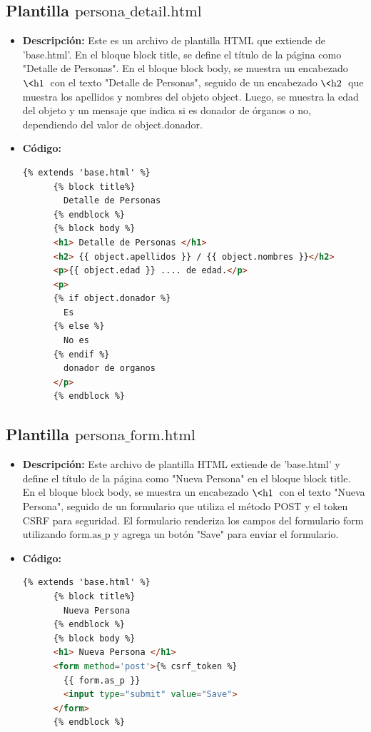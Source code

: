 \documentclass{article}
\begin{document}

  \subsection{Plantilla $\text{persona\_detail.html}$}
  \begin{itemize}
    \item \textbf{Descripción: }Este es un archivo de plantilla HTML que extiende de 'base.html'. 
    En el bloque block title, se define el título de la página como "Detalle de Personas". 
    En el bloque block body, se muestra un encabezado $\text{\<h1\>}$ con el texto "Detalle de Personas", 
    seguido de un encabezado $\text{\<h2\>}$ que muestra los apellidos y nombres del objeto object. Luego, se 
    muestra la edad del objeto y un mensaje que indica si es donador de órganos o no, dependiendo del valor de object.donador.
    \item \textbf{Código: }
    \begin{lstlisting}[language=html]
      {% extends 'base.html' %}
      {% block title%}
        Detalle de Personas
      {% endblock %}
      {% block body %}
      <h1> Detalle de Personas </h1>
      <h2> {{ object.apellidos }} / {{ object.nombres }}</h2>
      <p>{{ object.edad }} .... de edad.</p>
      <p>
      {% if object.donador %}
        Es
      {% else %}
        No es
      {% endif %}
        donador de organos
      </p>
      {% endblock %}
    \end{lstlisting}   
  \end{itemize}
  

  \subsection{Plantilla $\text{persona\_form.html}$}
  \begin{itemize}
    \item \textbf{Descripción: }Este archivo de plantilla HTML extiende de 'base.html' y define el título de la página como 
    "Nueva Persona" en el bloque block title. En el bloque block body, se muestra un encabezado $\text{\<h1\>}$
    con el texto "Nueva Persona", seguido de un formulario que utiliza el método POST y el token CSRF para seguridad. 
    El formulario renderiza los campos del formulario form utilizando {{ $\text{form.as\_p}$ }} y agrega un botón "Save" para 
    enviar el formulario.
    \item \textbf{Código: }
    \begin{lstlisting}[language=html]
      {% extends 'base.html' %}
      {% block title%}
        Nueva Persona
      {% endblock %}
      {% block body %}
      <h1> Nueva Persona </h1>
      <form method='post'>{% csrf_token %}
        {{ form.as_p }}
        <input type="submit" value="Save">
      </form>
      {% endblock %}
    \end{lstlisting}   
  \end{itemize}
  
\end{document}
